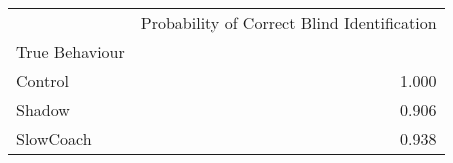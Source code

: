\begin{tabular}{lr}
\toprule
{} &  Probability of Correct Blind Identification \\
True Behaviour &                                              \\
\midrule
Control        &                                        1.000 \\
Shadow         &                                        0.906 \\
SlowCoach      &                                        0.938 \\
\bottomrule
\end{tabular}
